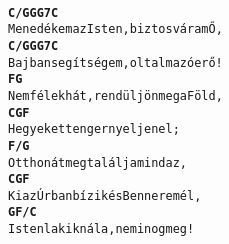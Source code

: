 \begin{minipage}{\textwidth}
\\\noscorespacing
\begin{minipage}{\textwidth}
\begin{alltt}
\textbf{C/              G G G7          C}
Menedékem az Isten, biztos váram Ő,
\textbf{ C/             G G G7          C}
Bajban segítségem,  oltalmazó erő!
\textbf{     F             G}
Nem félek hát, rendüljön meg a Föld,
\textbf{ C        G       F}
Hegyeket tenger nyeljen el;
\textbf{F/        G}
Otthonát megtalálja mindaz,
\textbf{      C      G        F}
Ki az Úrban bízik és Benne remél,
\textbf{G               F/          C}
Isten lakik nála, nem inog meg!
\end{alltt}
\vspace{0.0cm}
\versszakspacing
\end{minipage}
\end{minipage}
~\vspace{1.0cm}
\newline
